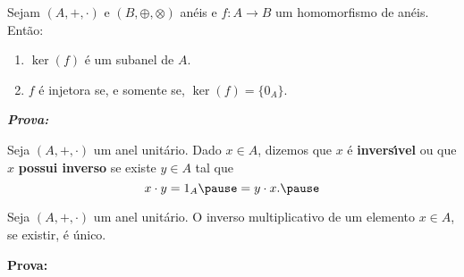 \documentclass{beamer}
\begin{document}
    \begin{frame}
        \begin{proposicao}
            Sejam $(A, +, \cdot)$ e $(B, \oplus, \otimes)$ an\'eis \pause e $f : A \to B$ um homomorfismo de an\'eis. \pause Ent\~ao:\pause
            \begin{enumerate}[label={\roman*})]
                \item $\ker(f)$ \'e um subanel de $A$.\pause

                \vspace{.5cm}

                \item $f$ \'e injetora \pause se, e somente se, \pause $\ker(f) = \{0_A\}$.\pause

                \vspace{.5cm}
            \end{enumerate}
        \end{proposicao}
    \end{frame}

    \begin{frame}
        \noindent \textbf{\textit{Prova: }}

        \vspace{6.5cm}
    \end{frame}

    \begin{frame}
        \begin{definicao}
            Seja $(A, +, \cdot)$ um anel unit\'ario. \pause Dado $x \in A$, \pause dizemos que $x$ \'e \textbf{invers{\'\i}vel} \pause ou que $x$ \textbf{possui inverso} \pause se existe $y \in A$ \pause tal que\pause
            \[
                x \cdot y = 1_A \pause = y \cdot x.\pause
            \]
        \end{definicao}
    \end{frame}

    \begin{frame}
        \begin{proposicao}
            Seja $(A, +, \cdot)$ um anel unit\'ario. \pause O inverso multiplicativo de um elemento $x \in A$, \pause se existir, \pause \'e \'unico.\pause
        \end{proposicao}
    
        \noindent \textbf{Prova:}
        \vspace{4.7cm}
    \end{frame}
\end{document}
